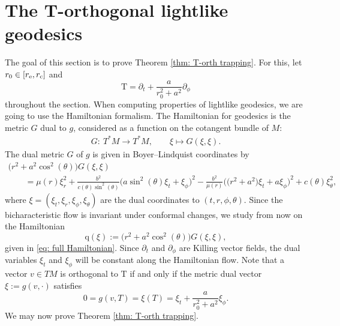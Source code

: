 \documentclass[pdftex]{sigma}
\renewcommand{\d}{\partial}
\newcommand{\T}{\mathrm T}
\newcommand{\q}{\mathrm q}
\numberwithin{equation}{section}
\begin{document}
\section{The T-orthogonal lightlike geodesics}

The goal of this section is to prove Theorem \ref{thm: T-orth trapping}.
For this, let $r_0 \in [r_{\rm e}, r_{\rm c}]$
and
\[
	\T
		= \d_t + \frac a{r_0^2 + a^2} \d_\phi
\]
throughout the section.
When computing properties of lightlike geodesics, we are going to use the Hamiltonian formalism.
The Hamiltonian for geodesics is the metric $G$ dual to $g$, considered as a function on the cotangent bundle of $M$:
\begin{align*}
	G\colon\ T^*M
		\to T^*M, \qquad
	\xi
		\mapsto G(\xi, \xi).
\end{align*}
The dual metric $G$ of $g$ is given in Boyer--Lindquist coordinates by
\begin{gather}
	\big(r^2 + a^2 \cos^2(\theta)\big)G(\xi, \xi)\nonumber\\
		\qquad= \mu(r) \xi_r^2 + \frac{b^2}{c(\theta)\sin^2(\theta)}\big(a \sin^2(\theta)\xi_t + \xi_\phi\big)^2 - \frac{b^2}{\mu(r)} \big(\big(r^2 + a^2\big) \xi_t + a \xi_\phi \big)^2 + c(\theta) \xi_\theta^2,
 \label{eq: full Hamiltonian}
\end{gather}
where $\xi = (\xi_t, \xi_r, \xi_\phi, \xi_\theta)$ are the dual coordinates to $(t, r, \phi, \theta)$.
Since the bicharacteristic flow is invariant under conformal changes, we study from now on the Hamiltonian
\[
	\q(\xi)
		:= \big(r^2 + a^2 \cos^2(\theta)\big)G(\xi, \xi),
\]
given in \eqref{eq: full Hamiltonian}.
Since $\d_t$ and $\d_\phi$ are Killing vector fields, the dual variables $\xi_t$ and $\xi_\phi$ will be constant along the Hamiltonian flow.
Note that a vector $v \in TM$ is orthogonal to $\T$ if and only if the metric dual vector $\xi
		:= g(v, \cdot)$ satisfies
\begin{equation} \label{eq: F vanishing}
	0
		= g(v, T)
		= \xi(T)
		= \xi_t + \frac a{r_0^2 + a^2} \xi_\phi.
\end{equation}
We may now prove Theorem \ref{thm: T-orth trapping}.
\end{document}
